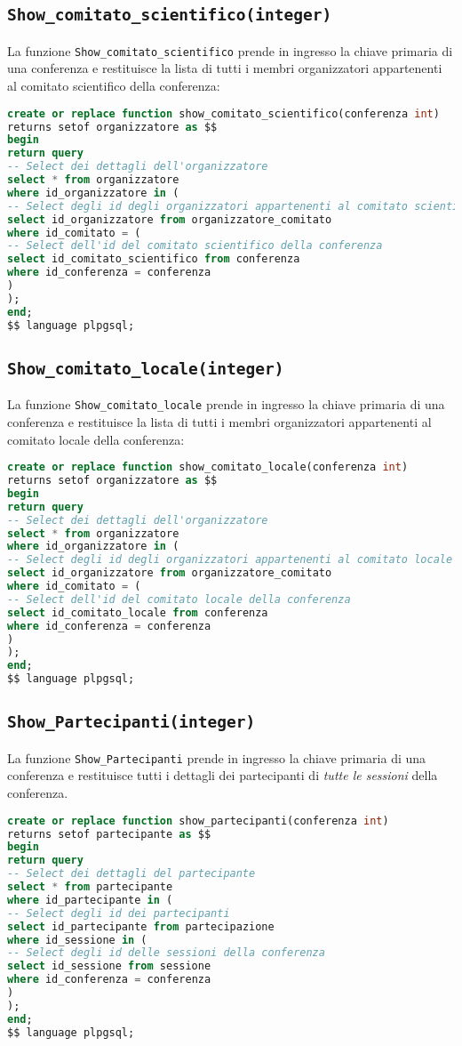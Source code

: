 \subsection{\texttt{Show\_comitato\_scientifico(integer)}}
La funzione \texttt{Show\_comitato\_scientifico} prende in ingresso la chiave primaria di una conferenza e restituisce la lista di tutti i membri organizzatori appartenenti al comitato scientifico della conferenza:
\begin{lstlisting}[language=SQL, style=mystyle]
create or replace function show_comitato_scientifico(conferenza int)
returns setof organizzatore as $$
begin
return query
-- Select dei dettagli dell'organizzatore
select * from organizzatore
where id_organizzatore in (
-- Select degli id degli organizzatori appartenenti al comitato scientifico
select id_organizzatore from organizzatore_comitato
where id_comitato = (
-- Select dell'id del comitato scientifico della conferenza
select id_comitato_scientifico from conferenza
where id_conferenza = conferenza
)
);
end;
$$ language plpgsql;
\end{lstlisting}
\subsection{\texttt{Show\_comitato\_locale(integer)}}
La funzione \texttt{Show\_comitato\_locale} prende in ingresso la chiave primaria di una conferenza e restituisce la lista di tutti i membri organizzatori appartenenti al comitato locale della conferenza:
\begin{lstlisting}[language=SQL, style=mystyle]
create or replace function show_comitato_locale(conferenza int)
returns setof organizzatore as $$
begin
return query
-- Select dei dettagli dell'organizzatore
select * from organizzatore
where id_organizzatore in (
-- Select degli id degli organizzatori appartenenti al comitato locale
select id_organizzatore from organizzatore_comitato
where id_comitato = (
-- Select dell'id del comitato locale della conferenza
select id_comitato_locale from conferenza
where id_conferenza = conferenza
)
);
end;
$$ language plpgsql;
\end{lstlisting}
\subsection{\texttt{Show\_Partecipanti(integer)}}
La funzione \texttt{Show\_Partecipanti} prende in ingresso la chiave primaria di una conferenza e restituisce tutti i dettagli dei partecipanti di \textit{tutte le sessioni} della conferenza.
\begin{lstlisting}[language=SQL,style=mystyle]
create or replace function show_partecipanti(conferenza int)
returns setof partecipante as $$
begin
return query
-- Select dei dettagli del partecipante
select * from partecipante
where id_partecipante in (
-- Select degli id dei partecipanti
select id_partecipante from partecipazione
where id_sessione in (
-- Select degli id delle sessioni della conferenza
select id_sessione from sessione
where id_conferenza = conferenza
)
);
end;
$$ language plpgsql;
\end{lstlisting}
